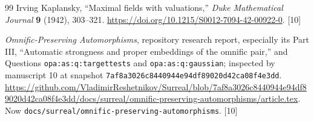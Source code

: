 \documentclass[11pt,letterpaper]{article}
\numberwithin{equation}{section}
\theoremstyle{definition}
\theoremstyle{remark}
\newcommand{\src}[1]{\textup{\textsf{\small[#1]}}}%
\newcommand{\lbl}[1]{\nolinkurl{#1}}%
\newcommand{\fn}[1]{\nolinkurl{#1}}%
\begin{document}
\begin{thebibliography}{99}
Irving Kaplansky, ``Maximal fields with valuations,''
\emph{Duke Mathematical Journal} \textbf{9} (1942), 303--321.
\url{https://doi.org/10.1215/S0012-7094-42-00922-0}. \src{10}

\emph{Omnific-Preserving Automorphisms}, repository research report,
especially its Part III, ``Automatic strongness and proper embeddings of the
omnific pair,'' and Questions \lbl{opa:as:q:targettests} and
\lbl{opa:as:q:gaussian}; inspected by manuscript 10 at snapshot
\texttt{7af8a3026c8440944e94df89020d42ca08f4e3dd}.
\url{https://github.com/VladimirReshetnikov/Surreal/blob/7af8a3026c8440944e94df89020d42ca08f4e3dd/docs/surreal/omnific-preserving-automorphisms/article.tex}.
Now \fn{docs/surreal/omnific-preserving-automorphisms}. \src{10}

\end{thebibliography}
\endgroup
\end{document}
